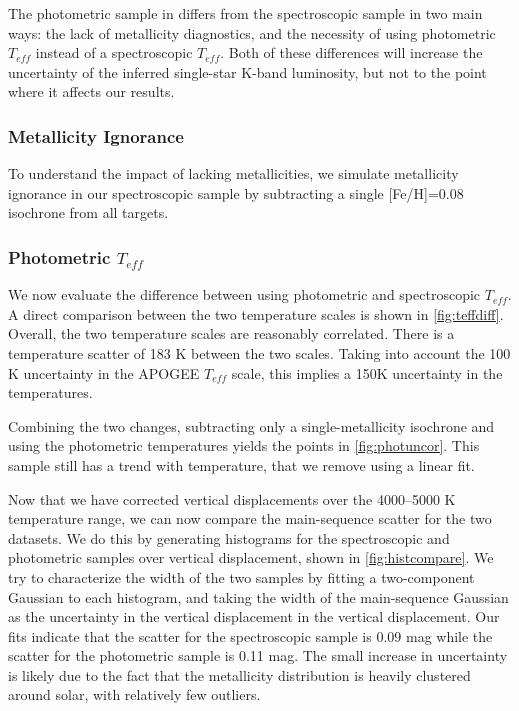 \documentclass[manuscript]{aastex6}
\newcommand{\Teff}{\ensuremath{T_{eff}}}
\begin{document}
The photometric sample in \citep{McQuillan14} differs from the spectroscopic
sample in two main ways: the lack of metallicity diagnostics, and the necessity
of using photometric \Teff{} instead of a spectroscopic \Teff{}. Both of these
differences will increase the uncertainty of the inferred single-star K-band
luminosity, but not to the point where it affects our results.

\subsubsection{Metallicity Ignorance}

To understand the impact of lacking metallicities, we simulate metallicity
ignorance in our spectroscopic sample by subtracting a single [Fe/H]=0.08
isochrone from all targets. 

\subsubsection{Photometric \Teff{}}

We now evaluate the difference between using photometric and spectroscopic
\Teff{}. A direct comparison between the two temperature scales is shown in 
\cref{fig:teffdiff}. Overall, the two temperature scales are reasonably
correlated. There is a temperature scatter of 183 K between the two scales.
Taking into account the 100 K uncertainty in the APOGEE \Teff{} scale, this
implies a 150K uncertainty in the \citep{Pinsonneault12} temperatures. 

Combining the two changes, subtracting only a single-metallicity isochrone and
using the photometric temperatures yields the points in \cref{fig:photuncor}.
This sample still has a trend with temperature, that we remove using a linear
fit.

Now that we have corrected vertical displacements over the 4000--5000 K
temperature range, we can now compare the main-sequence scatter for the two
datasets. We do this by generating histograms for the spectroscopic and
photometric samples over vertical displacement, shown in
\cref{fig:histcompare}. We try to characterize the width of the two samples by
fitting a two-component Gaussian to each histogram, and taking the width of the
main-sequence Gaussian as the uncertainty in the vertical displacement in the
vertical displacement. Our fits indicate that the scatter for the spectroscopic
sample is 0.09 mag while the scatter for the photometric sample is 0.11 mag.
The small increase in uncertainty is likely due to the fact that the
metallicity distribution is heavily clustered around solar, with relatively few
outliers.
\end{document}

